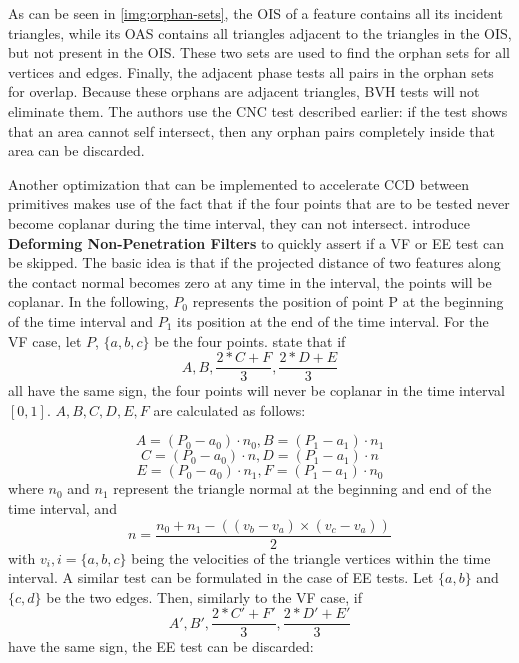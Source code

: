 
As can be seen in \autoref{img:orphan-sets}, the OIS of a feature contains all its incident triangles, while its OAS contains all triangles adjacent to the triangles in the OIS, but not present in the OIS. These two sets are used to find the orphan sets for all vertices and edges. Finally, the adjacent phase tests all pairs in the orphan sets for overlap. Because these orphans are adjacent triangles, BVH tests will not eliminate them. The authors use the CNC test described earlier: if the test shows that an area cannot self intersect, then any orphan pairs completely inside that area can be discarded.

Another optimization that can be implemented to accelerate CCD between primitives makes use of the fact that if the four points that are to be tested never become coplanar during the time interval, they can not intersect. \citep{tang-filter} introduce \textbf{Deforming Non-Penetration Filters} to quickly assert if a VF or EE test can be skipped. The basic idea is that if the projected distance of two features along the contact normal becomes zero at any time in the interval, the points will be coplanar. In the following, $P_{0}$ represents the position of point P at the beginning of the time interval and $P_{1}$ its position at the end of the time interval. For the VF case, let $P$, $\{a, b, c\}$ be the four points. \citep{tang-filter} state that if \[A, B, \frac{2 * C + F}{3}, \frac{2 * D + E}{3}\] all have the same sign, the four points will never be coplanar in the time interval $[0, 1]$. $A, B, C, D, E, F$ are calculated as follows:

\[A = (P_{0} - a_{0}) \cdot n_{0}, B = (P_{1} - a_{1}) \cdot n_{1} \]
\[C = (P_{0} - a_{0}) \cdot n, D = (P_{1} - a_{1}) \cdot n \]
\[E = (P_{0} - a_{0}) \cdot n_{1}, F = (P_{1} - a_{1}) \cdot n_{0} \] where $n_{0}$ and $n_{1}$ represent the triangle normal at the beginning and end of the time interval, and \[n = \frac{n_{0} + n_{1} - ((v_{b} - v_{a}) \times (v_{c} - v_{a}))}{2} \] with $v_{i}, i = \{a, b, c\}$ being the velocities of the triangle vertices within the time interval. A similar test can be formulated in the case of EE tests. Let $\{a, b\}$ and $\{c, d\}$ be the two edges. Then, similarly to the VF case, if \[A', B', \frac{2 * C' + F'}{3}, \frac{2 * D' + E'}{3}\] have the same sign, the EE test can be discarded:

